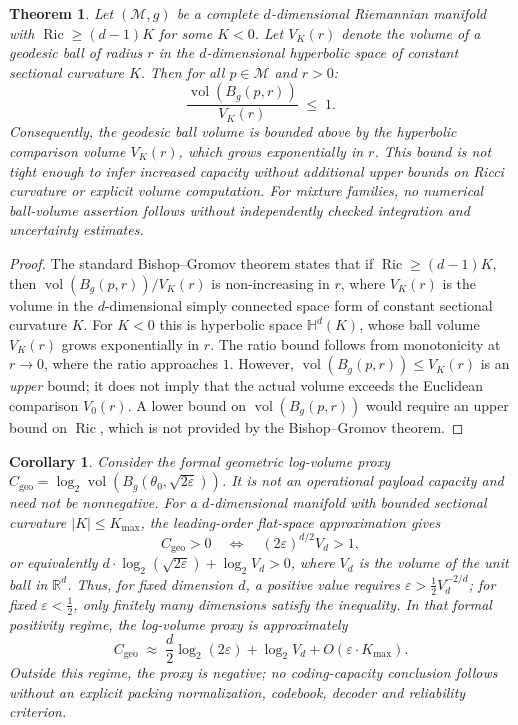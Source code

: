 \documentclass[a4paper,fleqn]{cas-dc}
\newtheorem{theorem}{Theorem}
\newtheorem{corollary}{Corollary}
\begin{document}
\begin{theorem}%
\label{thm:bishop_gromov_hyperbolic}
Let $(\mathcal{M},g)$ be a complete $d$-dimensional Riemannian manifold with 
$\operatorname{Ric} \geq (d-1)K$ for some $K<0$.  
Let $V_{K}(r)$ denote the volume of a geodesic ball of radius $r$ in the 
$d$-dimensional hyperbolic space of constant sectional curvature $K$.  
Then for all $p\in\mathcal{M}$ and $r>0$:
\[
\frac{\operatorname{vol}(B_{g}(p,r))}{V_{K}(r)} \;\leq\; 1.
\]
Consequently, the geodesic ball volume is bounded above by the hyperbolic 
comparison volume $V_{K}(r)$, which grows exponentially in $r$.  
This bound is not tight enough to infer increased capacity without additional 
upper bounds on Ricci curvature or explicit volume computation.  
For mixture families, no numerical ball-volume assertion follows
without independently checked integration and uncertainty estimates.
\end{theorem}

\begin{proof}
The standard Bishop--Gromov theorem \cite[Thm.~III.4.2]{chavel2006riemannian} 
states that if $\operatorname{Ric} \geq (d-1)K$, then 
$\operatorname{vol}(B_{g}(p,r))/V_{K}(r)$ is non-increasing in $r$, where 
$V_{K}(r)$ is the volume in the $d$-dimensional simply connected space form of 
constant sectional curvature $K$.  
For $K<0$ this is hyperbolic space $\mathbb{H}^{d}(K)$, whose ball volume 
$V_{K}(r)$ grows exponentially in $r$.  
The ratio bound follows from monotonicity at $r\to 0$, where the ratio 
approaches $1$.  
However, $\operatorname{vol}(B_{g}(p,r)) \leq V_{K}(r)$ is an \emph{upper} 
bound; it does not imply that the actual volume exceeds the Euclidean 
comparison $V_{0}(r)$.  
A lower bound on $\operatorname{vol}(B_{g}(p,r))$ would require an upper bound 
on $\operatorname{Ric}$, which is not provided by the Bishop--Gromov theorem.
\end{proof}

\begin{corollary}%
\label{cor:capacity_regime}
Consider the formal geometric log-volume proxy
$C_{\mathrm{geo}}=\log_{2}\operatorname{vol}(B_{g}
(\theta_{0},\sqrt{2\varepsilon}))$. It is not an operational
payload capacity and need not be nonnegative.
For a $d$-dimensional manifold with bounded sectional curvature
$|K|\leq K_{\max}$, the leading-order flat-space approximation gives
\[
C_{\mathrm{geo}}>0
\quad\Longleftrightarrow\quad
(2\varepsilon)^{d/2}V_{d}>1,
\]
or equivalently
$d\cdot\log_{2}(\sqrt{2\varepsilon})+\log_{2}V_{d}>0$,
where $V_{d}$ is the volume of the unit ball in $\mathbb{R}^{d}$.
Thus, for fixed dimension $d$, a positive value requires
$\varepsilon>\frac12 V_{d}^{-2/d}$; for fixed $\varepsilon<\frac12$, only
finitely many dimensions satisfy the inequality.
In that formal positivity regime, the log-volume proxy is approximately
\[
C_{\mathrm{geo}}
\;\approx\;
\frac{d}{2}\log_{2}(2\varepsilon)+\log_{2}V_{d}
+O(\varepsilon\cdot K_{\max}).
\]
Outside this regime, the proxy is negative; no coding-capacity conclusion
follows without an explicit packing normalization, codebook, decoder and
reliability criterion.
\end{corollary}
\end{document}
